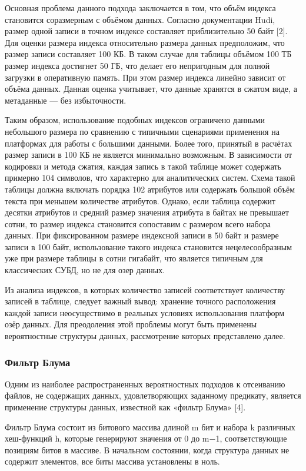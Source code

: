 Основная проблема данного подхода заключается в том, что объём индекса становится соразмерным с объёмом данных. Согласно документации Hudi, размер одной записи в точном индексе составляет приблизительно 50 байт [2]. Для оценки размера индекса относительно размера данных предположим, что размер записи составляет 100 КБ. В таком случае для таблицы объёмом 100 ТБ размер индекса достигнет 50 ГБ, что делает его непригодным для полной загрузки в оперативную память. При этом размер индекса линейно зависит от объёма данных. Данная оценка учитывает, что данные хранятся в сжатом виде, а метаданные — без избыточности.

Таким образом, использование подобных индексов ограничено данными небольшого размера по сравнению с типичными сценариями применения на платформах для работы с большими данными. Более того, принятый в расчётах размер записи в 100 КБ не является минимально возможным. В зависимости от кодировки и метода сжатия, каждая запись в такой таблице может содержать примерно 104 символов, что характерно для аналитических систем. Схема такой таблицы должна включать порядка 102 атрибутов или содержать большой объём текста при меньшем количестве атрибутов. Однако, если таблица содержит десятки атрибутов и средний размер значения атрибута в байтах не превышает сотни, то размер индекса становится сопоставим с размером всего набора данных. При фиксированном размере индексной записи в 50 байт и размере записи в 100 байт, использование такого индекса становится нецелесообразным уже при размере таблицы в сотни гигабайт, что является типичным для классических СУБД, но не для озер данных.

Из анализа индексов, в которых количество записей соответствует количеству записей в таблице, следует важный вывод: хранение точного 	расположения каждой записи неосуществимо в реальных условиях использования платформ озёр данных. Для преодоления этой проблемы могут быть применены вероятностные структуры данных, рассмотрение которых представлено далее.

\subsubsection{Фильтр Блума} 

Одним из наиболее распространенных вероятностных подходов к отсеиванию файлов, не содержащих данных, удовлетворяющих заданному предикату, является применение структуры данных, известной как «фильтр Блума» [4].

Фильтр Блума состоит из битового массива длиной m бит и набора k различных хеш-функций h, которые генерируют значения от 0 до m−1, соответствующие позициям битов в массиве. В начальном состоянии, когда структура данных не содержит элементов, все биты массива установлены в ноль.

